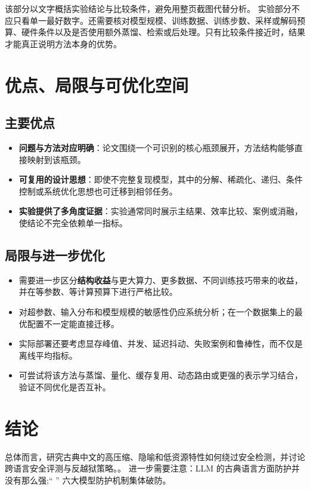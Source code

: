 \documentclass[UTF8,11pt,a4paper]{ctexart}
\newcommand{\term}[1]{\textbf{\textcolor{mainblue}{#1}}}
\begin{document}
该部分以文字概括实验结论与比较条件，避免用整页截图代替分析。
实验部分不应只看单一最好数字。还需要核对模型规模、训练数据、训练步数、采样或解码预算、硬件条件以及是否使用额外蒸馏、检索或后处理。只有比较条件接近时，结果才能真正说明方法本身的优势。

\section{优点、局限与可优化空间}
\subsection{主要优点}
\begin{itemize}
\item \term{问题与方法对应明确}：论文围绕一个可识别的核心瓶颈展开，方法结构能够直接映射到该瓶颈。
\item \term{可复用的设计思想}：即使不完整复现模型，其中的分解、稀疏化、递归、条件控制或系统优化思想也可迁移到相邻任务。
\item \term{实验提供了多角度证据}：实验通常同时展示主结果、效率比较、案例或消融，使结论不完全依赖单一指标。
\end{itemize}

\subsection{局限与进一步优化}
\begin{itemize}
\item 需要进一步区分\term{结构收益}与更大算力、更多数据、不同训练技巧带来的收益，并在等参数、等计算预算下进行严格比较。
\item 对超参数、输入分布和模型规模的敏感性仍应系统分析；在一个数据集上的最优配置不一定能直接迁移。
\item 实际部署还要考虑显存峰值、并发、延迟抖动、失败案例和鲁棒性，而不仅是离线平均指标。
\item 可尝试将该方法与蒸馏、量化、缓存复用、动态路由或更强的表示学习结合，验证不同优化是否互补。
\end{itemize}

\section{结论}
总体而言，研究古典中文的高压缩、隐喻和低资源特性如何绕过安全检测，并讨论跨语言安全评测与反越狱策略。。 进一步需要注意：LLM 的古典语言方面防护并没有那么强;“ ” 六大模型防护机制集体破防。
\end{document}
